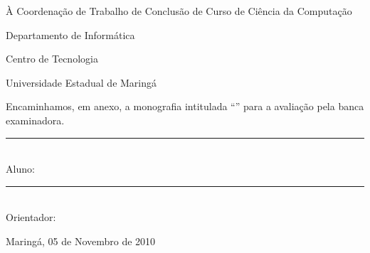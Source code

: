 \pagestyle{empty}
\noindent
À Coordenação de Trabalho de Conclusão de Curso de Ciência da Computação

\noindent
Departamento de Informática

\noindent
Centro de Tecnologia

\noindent
Universidade Estadual de Maringá

\vspace{4cm}

Encaminhamos, em anexo, a monografia intitulada ``\doctitulo''
para a avaliação pela banca examinadora.

\vspace{2cm}

\begin{flushright}
\parbox{10cm}
{
\begin{center}

\rule{10cm}{.02cm} \\
Aluno: \docautor \\
\vspace{.40in}

\rule{10cm}{.02cm} \\
Orientador: \docorient \\

\end{center}
}

\end{flushright}


\vspace{7cm}


\begin{center}

Maringá, 05 de Novembro de 2010

\end{center}
